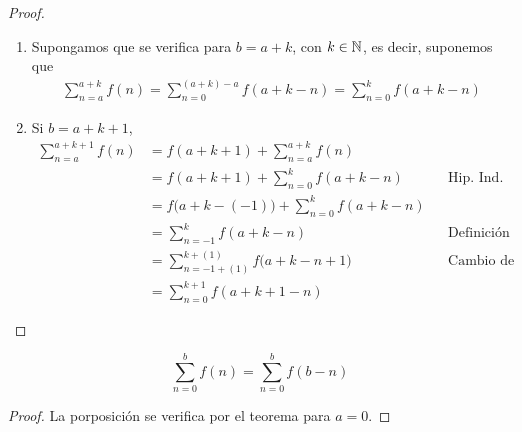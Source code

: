 \begin{enumerate}[label=\alph*)]
\begin{proof}
\begin{enumerate}[label=\Roman*)]
\begin{enumerate}[label=\roman*)]
      \item Supongamos que se verifica para $b=a+k$, con $k\in \mathbb{N}$, es decir, suponemos que
      \begin{align*}
        \sum_{n=a}^{a+k}f(n) = \sum_{n=0}^{(a+k)-a} f(a+k-n) = \sum_{n=0}^{k} f(a+k-n)
      \end{align*}

      \item Si $b=a+k+1$,
      \begin{align*}
        \sum_{n=a}^{a+k+1} f(n) &= f(a+k+1) + \sum_{n=a}^{a+k} f(n)\\
        &= f(a+k+1) + \sum_{n=0}^{k} f(a+k-n) && \text{Hip. Ind.}\\
        &= f\bigl(a+k-(-1)\bigr) + \sum_{n=0}^{k} f(a+k-n)\\
        &= \sum_{n=-1}^k f(a+k-n) && \text{Definición (de sumatoria)}\\
        &= \sum_{n=-1+(1)}^{k+(1)} f\bigl(a+k-n+1\bigr) && \text{Cambio de índice}\\
        &= \sum_{n=0}^{k+1} f(a+k+1-n)
      \end{align*}
      
    \end{enumerate}

    \end{enumerate}
  \end{proof}

   \[\sum_{n=0}^{b}f(n) = \sum_{n=0}^{b} f(b-n)\]

  \begin{proof}\leavevmode
    La porposición se verifica por el teorema para $a=0$.
  \end{proof}
  

\end{enumerate}
